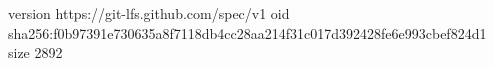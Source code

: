 version https://git-lfs.github.com/spec/v1
oid sha256:f0b97391e730635a8f7118db4cc28aa214f31c017d392428fe6e993cbef824d1
size 2892

